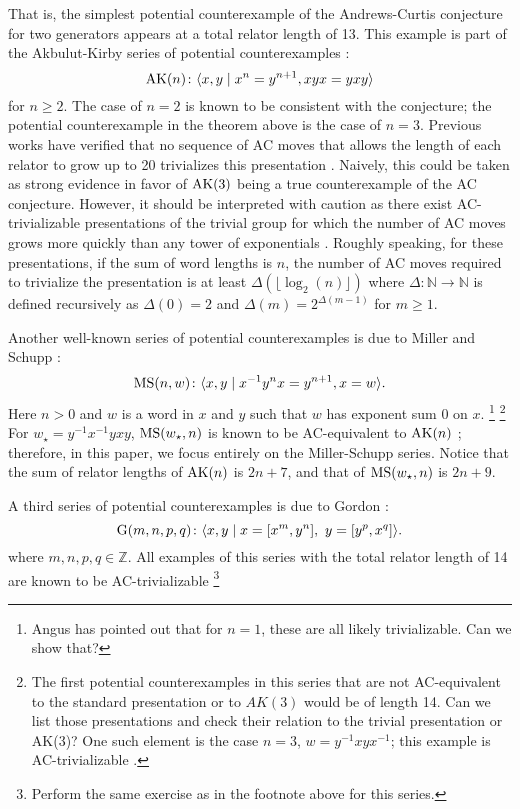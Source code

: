 That is, the simplest potential counterexample of the Andrews-Curtis conjecture for two generators
appears at a total relator length of 13.
This example is part of the Akbulut-Kirby series of potential counterexamples \cite{Akbulut-Kirby}:
\[
\text{AK}(n) \colon \langle x, y \mid x^n = y^{n+1}, xyx = yxy\rangle
\]
for $n \geq 2.$ The case of $n=2$ is known to be consistent with the conjecture; the potential counterexample
in the theorem above is the case of $n=3$.
Previous works have verified that no sequence of AC moves that allows the length of each relator to grow up to 20 trivializes this presentation \cite{Panteleev-Ushakov}.
Naively, this could be taken as strong evidence in favor of $\text{AK}(3)$ being a true counterexample of the AC conjecture.
However, it should be interpreted with caution as there exist AC-trivializable presentations of the trivial group for which the number of AC moves grows more quickly than any tower of exponentials \cite{Bridson, Lishak}.
Roughly speaking, for these presentations, if the sum of word lengths is $n$, the number of AC moves required to trivialize the presentation is at least $\Delta (\lfloor \log_2 (n) \rfloor)$ where $\Delta \colon \mathbb{N} \to \mathbb{N}$ is defined recursively as $\Delta(0) = 2$ and $\Delta (m) = 2^{\Delta(m-1)}$ for $m \geq 1$.
\newline

Another well-known series of potential counterexamples is due to Miller and Schupp \cite{Miller-Schupp}:
\[
\text{MS}(n, w) \colon \langle x, y \mid x^{-1} y^n x = y^{n+1}, x = w\rangle.
\]
Here $n > 0$ and $w$ is a word in $x$ and $y$ such that $w$ has exponent sum 0
on $x$.
\footnote{Angus has pointed out that for $n=1$, these are all likely trivializable.
Can we show that?
	 }
\footnote{The first potential counterexamples in this series that are not AC-equivalent to the standard presentation or to $AK(3)$ would be of length 14.
Can we list those presentations and	check their relation to the trivial presentation or AK(3)? One such element is the case $n=3$, $w = y^{-1} x y x^{-1}$; this example is AC-trivializable \cite{morse}.}
For $w_\star = y^{-1} x^{-1} y x y$, $\text{MS}(w_\star, n)$ is known to be AC-equivalent to $\text{AK}(n)$ \cite{MMS}; therefore, in this paper, we focus entirely on the Miller-Schupp series.
Notice that the sum of relator lengths of $\text{AK}(n)$ is $2n+7$, and that of $\text{MS}(w_\star, n)$ is $2n+9$.
\newline

A third series of potential counterexamples is due to Gordon \cite{Brown}:
\[
\text{G}(m, n, p, q) \colon \langle x, y \mid x = [x^m, y^n],\ y = [y^p, x^q]\rangle.
\]
where $m,n,p,q \in \mathbb{Z}$.
All examples of this series with the total relator length of 14 are known
to be AC-trivializable \cite{Bowman-McCaul}
\footnote{Perform the same exercise as in the footnote above for this series.}
\newline

